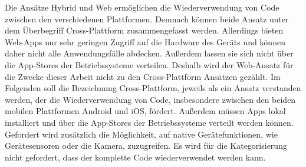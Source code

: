 Die Ansätze Hybrid und Web ermöglichen die Wiederverwendung von Code zwischen den verschiedenen Plattformen.
Demnach können beide Ansatz unter dem Überbegriff Cross-Plattform zusammengefasst werden.
Allerdings bieten Web-Apps nur sehr geringen Zugriff auf die Hardware des Geräts und können daher nicht alle Anwendungsfälle abdecken.
Außerdem lassen sie sich nicht über die App-Stores der Betriebssysteme verteilen.
Deshalb wird der Web-Ansatz für die Zwecke dieser Arbeit nicht zu den Cross-Plattform Ansätzen gezählt.
Im Folgenden soll die Bezeichnung Cross-Plattform, jeweils als ein Ansatz verstanden werden, der die Wiederverwendung von Code, insbesondere zwischen den beiden mobilen Plattformen Android und iOS, fördert.
Außerdem müssen Apps lokal installiert und über die App-Stores der Betriebssysteme verteilt werden können.
Gefordert wird zusätzlich die Möglichkeit, auf native Gerätefunktionen, wie Gerätesensoren oder die Kamera, zuzugreifen.
Es wird für die Kategorisierung nicht gefordert, dass der komplette Code wiederverwendet werden kann.

